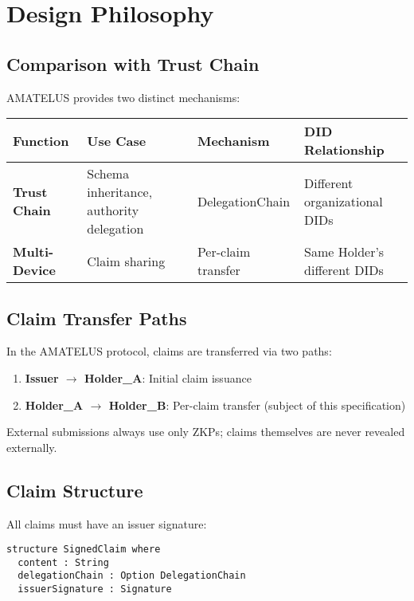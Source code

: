 \section{Design Philosophy}

\subsection{Comparison with Trust Chain}

AMATELUS provides two distinct mechanisms:

\begin{table}[H]
\centering
\begin{tabular}{|l|l|l|l|}
\hline
\textbf{Function} & \textbf{Use Case} & \textbf{Mechanism} & \textbf{DID Relationship} \\
\hline
\textbf{Trust Chain} & Schema inheritance, authority delegation & DelegationChain & Different organizational DIDs \\
\hline
\textbf{Multi-Device} & Claim sharing & Per-claim transfer & Same Holder's different DIDs \\
\hline
\end{tabular}
\end{table}

\subsection{Claim Transfer Paths}

In the AMATELUS protocol, claims are transferred via two paths:

\begin{enumerate}
  \item \textbf{Issuer $\rightarrow$ Holder\_A}: Initial claim issuance
  \item \textbf{Holder\_A $\rightarrow$ Holder\_B}: Per-claim transfer (subject of this specification)
\end{enumerate}

External submissions always use only ZKPs; claims themselves are never revealed externally.

\subsection{Claim Structure}

All claims must have an issuer signature:

\begin{verbatim}
structure SignedClaim where
  content : String
  delegationChain : Option DelegationChain
  issuerSignature : Signature
\end{verbatim}

